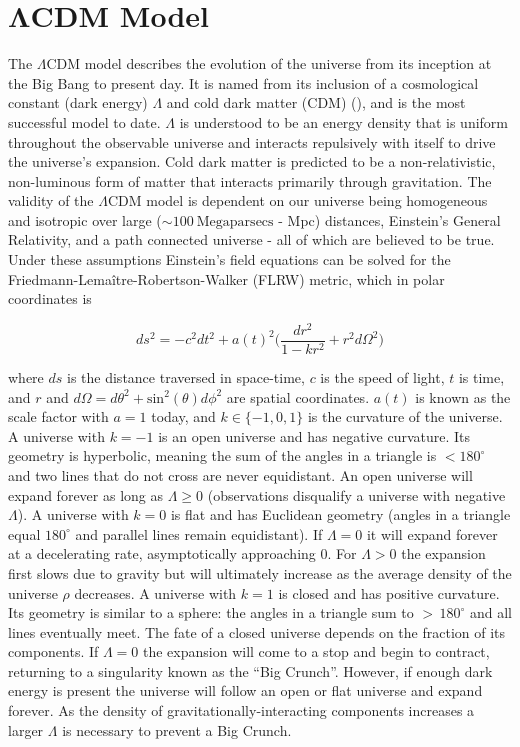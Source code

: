 \section[$\Lambda$CDM Model][$\Lambda$ CDM Model]{$\boldsymbol{\Lambda}$CDM Model}
\label{sec:dark_matter_lambda_cdm}
The $\Lambda \mathrm{CDM}$ model describes the evolution of the universe from its inception at the Big Bang to present day.  It is named
from its inclusion of a cosmological constant (dark energy) $\Lambda$ and cold dark matter (CDM) (), and is the
most successful model to
date.  $\Lambda$ is understood to be an energy density that is uniform throughout the observable universe and interacts repulsively with
itself to drive the universe's expansion.  Cold dark matter is predicted to be a non-relativistic, non-luminous form of matter that
interacts primarily through gravitation.  The validity of the $\Lambda \mathrm{CDM}$ model is dependent on our universe being homogeneous
and isotropic over large
(${\sim} 100\ \mathrm{Megaparsecs}$ - Mpc) distances,
Einstein's General Relativity, and a path connected universe - all of which are believed to be true.  Under these assumptions Einstein's
field equations can be solved for the Friedmann-Lema\^{i}tre-Robertson-Walker (FLRW) metric, which in polar coordinates is

\begin{equation}
ds^{2} = -c^{2}dt^{2} + a(t)^{2} \bigg( \frac{dr^{2}}{1 - kr^{2}} + r^{2}d\Omega^{2} \bigg)
\label{eq:dark_matter_lambda_cdm_rw_metric}
\end{equation}

\noindent where $ds$ is the distance traversed in space-time, $c$ is the speed of light, $t$ is time, and $r$ and
$d\Omega = d\theta^2 + \mathrm{sin}^2(\theta)d\phi^2$ are spatial coordinates.  $a(t)$ is known as the scale factor with $a=1$ today, and
$k \in \{-1, 0, 1\}$ is the curvature of the
universe.  A universe with $k = -1$ is an open universe and has negative curvature.  Its geometry is hyperbolic, meaning the
sum of the angles in a triangle is $< 180^{\circ}$ and two lines that do not cross are never equidistant.  An open universe will expand
forever as long as $\Lambda \geq 0$ (observations disqualify a universe with negative $\Lambda$).  A universe with $k = 0$ is flat and
has Euclidean geometry (angles in a triangle equal $180^{\circ}$ and parallel lines remain equidistant).  If $\Lambda = 0$ it will
expand forever at a decelerating rate, asymptotically approaching 0.  For $\Lambda > 0$ the expansion first slows due to gravity but will
ultimately increase as the average density of the universe $\rho$ decreases.  A universe with $k = 1$ is closed and has positive
curvature.  Its geometry is similar to a sphere: the angles in
a triangle sum to ${>}\, 180^{\circ}$ and all lines eventually meet.  The fate of a closed universe depends on the fraction of its
components.  If $\Lambda = 0$ the expansion will come to a stop and begin to
contract, returning to a singularity known as the ``Big Crunch''.  However, if enough dark energy is present the universe will follow
an open or flat universe and expand forever.  As the density of gravitationally-interacting components increases a larger $\Lambda$ is
necessary to prevent a Big Crunch.

